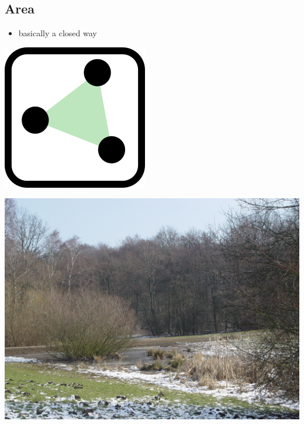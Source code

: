 \documentclass{beamer}
\begin{document}
			
	\subsection{Area}
	
	\begin{frame}
		\begin{itemize}
			\item basically a closed way
		\end{itemize}
		
		\vfill
		
		\begin{center}
			\begin{minipage}[b][0.6\textheight][c]{0.2\linewidth}
				\centering
				\includegraphics[width=0.5\linewidth,height=0.5\textheight,keepaspectratio]{images/240px-Mf_area.png}
			\end{minipage}
			\begin{minipage}[b][0.6\textheight][c]{0.4\linewidth}
				\centering
				\includegraphics[width=0.8\linewidth,height=0.8\textheight,keepaspectratio]{images/Stellinger_Feldmark_ESE_01.JPG}

\end{minipage}
\end{center}
\end{frame}
\end{document}

